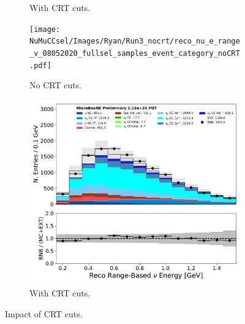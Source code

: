 \begin{figure}[hbt!]
\begin{center}
\begin{subfigure}[b]{0.35\textwidth}
        \caption{With CRT cuts.}
        \label{fig:NuMUCCsel:ryan:run3_costheta_withCRT}
    \end{subfigure}
    \begin{subfigure}[b]{0.35\textwidth}
        \centering
        \texttt{[image: NuMuCCsel/Images/Ryan/Run3\_nocrt/reco\_nu\_e\_range\_v\_08052020\_fullsel\_samples\_event\_category\_noCRT.pdf]}
        \caption{No CRT cuts.}
        \label{fig:NuMUCCsel:ryan:run3_Enu_noCRT}
    \end{subfigure}
    \begin{subfigure}[b]{0.35\textwidth}
        \centering
        \includegraphics[width=1.00\textwidth]{NuMuCCsel/Images/Ryan/fullselection_run3_fullsystematics/reco_nu_e_range_v_07232020_fullsel_samples_detsys_event_category.pdf}
        \caption{With CRT cuts.}
        \label{fig:NuMUCCsel:ryan:run3_Enu_withCRT}
    \end{subfigure}
\caption{Impact of CRT cuts.}
\label{fig:NuMuCCsel:crtimpact}
\end{center}
\end{figure}

